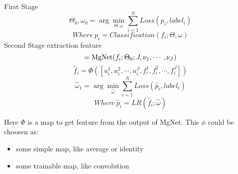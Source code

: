 \begin{breakablealgorithm}
	\caption{$[\hat{\omega}_1]={\rm Two \ Stage \ Training}(\{f_i\}_1^N; \{label_i\}_1^N,\Phi,J,\nu_1, \cdots, \nu_J)$}
	\label{two stage training}
	\begin{algorithmic}
		\State First Stage
		\begin{equation}
		\Theta_0,\omega_0 = \arg \min_{\Theta,\omega} \sum_{i=1}^N Loss(p_i, label_i )
		\end{equation}
		\begin{equation}
		Where\  p_i = Classification(f_i; \Theta,\omega)  \label{stage 1}
		\end{equation}
		\State Second Stage
		\State extraction feature
		\begin{equation}
		[u_i^1,u_i^2,\cdots,u_i^J,f_i^1,f_i^2,\cdots,f_i^J]={\rm MgNet}(f_i; \Theta_0;J,\nu_1, \cdots, \nu_J) 
		\end{equation}
		\begin{equation}
		\hat{f}_i = \Phi([u_i^1,u_i^2,\cdots,u_i^J,f_i^1,f_i^2,\cdots,f_i^J])
		\end{equation}
		\EndFor
		\begin{equation}
		\hat{\omega}_1 = \arg \min_{\hat{\omega}} \sum_{i=1}^N Loss(\hat{p}_i, label_i )
		\end{equation}
		\begin{equation}
		Where\  \hat{p}_i = LR(\hat{f}_i; \hat{\omega}) \label{stage 2}
		\end{equation}
	\end{algorithmic}
\end{breakablealgorithm}
Here $\Phi$ is a map to get feature from the output of MgNet. This $\phi$ could be choosen as:
\begin{itemize}
	\item some simple map, like average or identity
	\item some trainable map, like convolution
\end{itemize}

